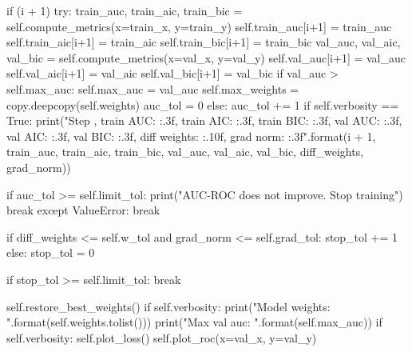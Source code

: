 \documentclass[14pt, a4paper]{article}
\theoremstyle{sltheorem}
\theoremstyle{soltheorem}
\begin{document}
\begin{python}
            if (i + 1) %
                try:
                    train_auc, train_aic, train_bic = self.compute_metrics(x=train_x, y=train_y)
                    self.train_auc[i+1] = train_auc
                    self.train_aic[i+1] = train_aic
                    self.train_bic[i+1] = train_bic
                    val_auc, val_aic, val_bic = self.compute_metrics(x=val_x, y=val_y)
                    self.val_auc[i+1] = val_auc
                    self.val_aic[i+1] = val_aic
                    self.val_bic[i+1] = val_bic
                    if val_auc > self.max_auc:
                        self.max_auc = val_auc
                        self.max_weights = copy.deepcopy(self.weights)
                        auc_tol = 0
                    else:
                        auc_tol += 1
                    if self.verbosity == True:
                        print("Step {}, train AUC: {:.3f}, train AIC: {:.3f}, train BIC: {:.3f}, val AUC: {:.3f}, val AIC: {:.3f}, val BIC: {:.3f}, diff weights: {:.10f}, grad norm: {:.3f}".format(i + 1, train_auc, train_aic, train_bic, val_auc, val_aic, val_bic, diff_weights, grad_norm))

                    if auc_tol >= self.limit_tol:
                        print("AUC-ROC does not improve. Stop training")
                        break
                except ValueError:
                    break
                
            if diff_weights <= self.w_tol and grad_norm <= self.grad_tol:
                stop_tol += 1
            else:
                stop_tol = 0
                
            if stop_tol >= self.limit_tol:
                break
            
        self.restore_best_weights()
        if self.verbosity:
            print("Model weights: {}".format(self.weights.tolist()))
        print("Max val auc: {}".format(self.max_auc))
        if self.verbosity:
            self.plot_loss()
            self.plot_roc(x=val_x, y=val_y)
\end{python}
\end{document}
